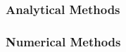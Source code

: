 
\subsubsection{Analytical Methods}

\subsubsection{Numerical Methods}




\begin{comment}


https://en.wikipedia.org/wiki/Fokker%
https://en.wikipedia.org/wiki/Convection%
https://en.wikipedia.org/wiki/Klein%
https://en.wikipedia.org/wiki/Master_equation


Reaction-Diffusion Equations:

https://en.wikipedia.org/wiki/Turing_pattern
https://en.wikipedia.org/wiki/Reaction%
https://en.wikipedia.org/wiki/The_Chemical_Basis_of_Morphogenesis
https://www.youtube.com/watch?v=JLkCaBwRrVo   The Mathematical Code Hidden In Nature

https://www.youtube.com/watch?v=alH3yc6tX98   Can Math Explain How Animals Get Their Patterns?
  -> shows equations in the nicest form (without explaining them):
  da / dt = d_a * Lap(a) + F(a,b)
  db / dt = d_b * Lap(b) + G(a,b)
-I think, a is the concentration of the activator, b the concentration of the inhibitor, d_a and
 d_b their respective diffusion coeffs and F,G encode the reactions. Lap(..) means the Laplacian.
 The inhibitor spreads/diffuses faster than the activator. The initial condition is a random 
 distribution of both.
-What should go into F and G? Maybe F(a,b) = p*a - q*a*b, G(a,b) = r*a - s*a*b
 p,q,r,s are all positive, p controls how the activator reproduces itself, r controls how the
 activator produces inhibitor, q controls how the inhibitor inhibits reproduction of activator and
 s controls how the inhibitor inhibits its own reproduction (by reducing the amount of actiavtor)?
 Or maybe it should be  G(a,b) = r*a - s*b*b  or   G(a,b) = r*a - s*b  the last seems most plausible
 for the bunnies-and-foxes situation. Isn't that a bit similar to how I obtained the SIRP model from
 the SIR model - just the same idea applied to the Volterra-Lotka model?
-We could also write these equations in 2D as
 a_t = d_a (a_{xx} + a_{yy}) + F(a,b)
 b_t = d_b (b_{xx} + b_{yy}) + G(a,b)



\end{comment}
